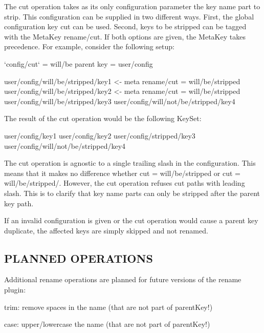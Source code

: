 The cut operation takes as its only configuration parameter the key name part to strip. This configuration can be supplied in two different ways. First, the global configuration key {\ttfamily cut} can be used. Second, keys to be stripped can be tagged with the Meta\+Key {\ttfamily rename/cut}. If both options are given, the Meta\+Key takes precedence. For example, consider the following setup\+: \begin{DoxyVerb}                            `config/cut` = will/be
                            parent key = user/config

                            user/config/will/be/stripped/key1                       <- meta rename/cut = will/be/stripped
                            user/config/will/be/stripped/key2                       <- meta rename/cut = will/be/stripped
                            user/config/will/be/stripped/key3
                            user/config/will/not/be/stripped/key4
\end{DoxyVerb}


The result of the cut operation would be the following Key\+Set\+: \begin{DoxyVerb}                            user/config/key1
                            user/config/key2
                            user/config/stripped/key3
                            user/config/will/not/be/stripped/key4
\end{DoxyVerb}


The cut operation is agnostic to a single trailing slash in the configuration. This means that it makes no difference whether {\ttfamily cut = will/be/stripped} or {\ttfamily cut = will/be/stripped/}. However, the cut operation refuses cut paths with leading slash. This is to clarify that key name parts can only be stripped after the parent key path.

If an invalid configuration is given or the cut operation would cause a parent key duplicate, the affected keys are simply skipped and not renamed.

\subsection*{P\+L\+A\+N\+N\+E\+D O\+P\+E\+R\+A\+T\+I\+O\+N\+S}

Additional rename operations are planned for future versions of the rename plugin\+:
\begin{DoxyItemize}
\item trim\+: remove spaces in the name (that are not part of parent\+Key!)
\item case\+: upper/lowercase the name (that are not part of parent\+Key!) 
\end{DoxyItemize}